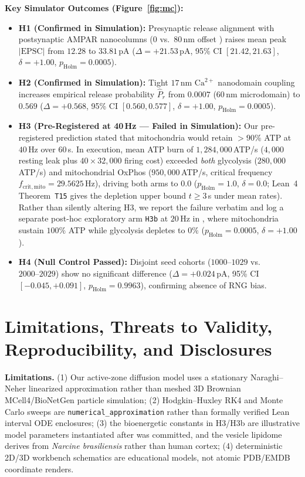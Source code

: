 \documentclass[11pt,letterpaper]{amsart}
\begin{document}
\noindent\textbf{Key Simulator Outcomes (Figure~\ref{fig:mc}):}\par\nopagebreak
\begin{itemize}
  \item \textbf{H1 (Confirmed in Simulation):} Presynaptic release alignment with postsynaptic AMPAR nanocolumns ($0$ vs.\ $80\,$nm offset \cite{tang2016nanocolumn}) raises mean peak $|\text{EPSC}|$ from $12.28$ to $33.81\,$pA ($\Delta = +21.53\,$pA, 95\% CI $[21.42, 21.63]$, $\delta = +1.00$, $p_{\mathrm{Holm}} = 0.0005$).
  \item \textbf{H2 (Confirmed in Simulation):} Tight $17\,$nm $\mathrm{Ca}^{2+}$ nanodomain coupling increases empirical release probability $\hat{P}_r$ from $0.0007$ ($60\,$nm microdomain) to $0.569$ ($\Delta = +0.568$, 95\% CI $[0.560, 0.577]$, $\delta = +1.00$, $p_{\mathrm{Holm}} = 0.0005$).
  \item \textbf{H3 (Pre-Registered at 40\,Hz — Failed in Simulation):} Our pre-registered prediction stated that mitochondria would retain $>90\%$ ATP at $40\,$Hz over $60\,$s. In execution, mean ATP burn of $1{,}284{,}000\,$ATP/s ($4{,}000$ resting leak plus $40 \times 32{,}000$ firing cost) exceeded \emph{both} glycolysis ($280{,}000\,$ATP/s) and mitochondrial OxPhos ($950{,}000\,$ATP/s, critical frequency $f_{\mathrm{crit,mito}} = 29.5625\,$Hz), driving both arms to $0.0$ ($p_{\mathrm{Holm}}=1.0$, $\delta=0.0$; Lean~4 Theorem~\texttt{T15} gives the depletion upper bound $t \ge 3\,$s under mean rates). Rather than silently altering H3, we report the failure verbatim and log a separate post-hoc exploratory arm \texttt{H3b} at $20\,$Hz in , where mitochondria sustain $100\%$ ATP while glycolysis depletes to $0\%$ ($p_{\mathrm{Holm}}=0.0005$, $\delta=+1.00$).
  \item \textbf{H4 (Null Control Passed):} Disjoint seed cohorts ($1000\text{--}1029$ vs.\ $2000\text{--}2029$) show no significant difference ($\Delta = +0.024\,$pA, 95\% CI $[-0.045, +0.091]$, $p_{\mathrm{Holm}} = 0.9963$), confirming absence of RNG bias.
\end{itemize}

\section{Limitations, Threats to Validity, Reproducibility, and Disclosures}

\textbf{Limitations.} (1) Our active-zone diffusion model uses a stationary Naraghi--Neher linearized approximation \cite{naraghi1997buffered} rather than meshed 3D Brownian MCell4/BioNetGen particle simulation; (2) Hodgkin--Huxley RK4 and Monte Carlo sweeps are \texttt{numerical\_approximation} rather than formally verified Lean interval ODE enclosures; (3) the bioenergetic constants in H3/H3b are illustrative model parameters instantiated after  was committed, and the vesicle lipidome derives from \emph{Narcine brasiliensis} rather than human cortex; (4) deterministic 2D/3D workbench schematics are educational models, not atomic PDB/EMDB coordinate renders.
\end{document}
